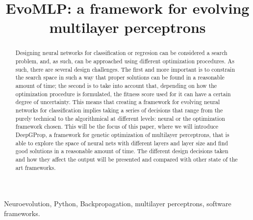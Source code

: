 \documentclass[conference]{IEEEtran}\usepackage[]{graphicx}\usepackage[]{color}
\begin{document}
%
\title{EvoMLP: a framework for evolving multilayer perceptrons}
%
\author{
  \and
  \and
}
%
\maketitle              %

\begin{abstract}

Designing neural networks for classification or regresion can be
considered a search problem, and, as such, can be approached using
different optimization procedures. As such, there are several design
challenges. The first and more important is to constrain the search
space in such a way that proper solutions can be found in a reasonable
amount of time; the second is to take into account that, depending on
how the optimization procedure is formulated, the fitness score used
for it can have a certain degree of uncertainty. This means that
creating a framework for evolving neural networks for classification
implies taking a series of decisions that range from the purely
technical to the algorithmical at different levels: neural or the
optimization framework chosen. This will be the focus of this paper,
where we will introduce DeepGProp, a framework for genetic
optimization of multilayer perceptrons, that is able to explore the
space of neural nets with different layers and layer size and find
good solutions in a reasonable amount of time. The different design
decisions taken and how they affect the output will be presented and
compared with other state of the art frameworks.

\end{abstract}

\begin{IEEEkeywords}
  Neuroevolution, Python, Backpropagation, multilayer perceptrons,
  software frameworks.
\end{IEEEkeywords}
\end{document}
